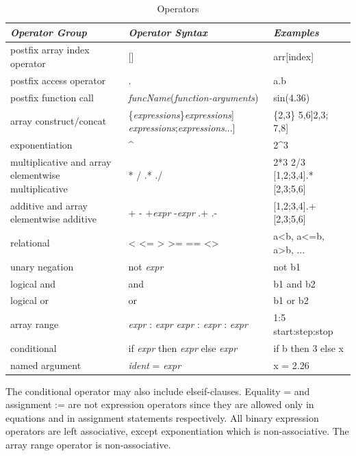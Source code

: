 \documentclass[10pt,a4paper]{report}
\begin{document}
\begin{table}
\caption{Operators}
\begin{tabular}{|p{3cm}|p{4cm}|p{3.5cm}|}
\hline
\emph{Operator Group} & \emph{Operator Syntax} & \emph{Examples} \\ \hline 
postfix array index operator & {[}{]} & arr{[}index{]} \\ \hline
postfix access operator & . & a.b \\ \hline
postfix function call & \emph{funcName}(\emph{function-arguments}) & sin(4.36)\\ \hline
array construct/concat & \{\emph{expressions}\}\linebreak {[}\emph{expressions}{]} \linebreak{[}\emph{expressions};\linebreak \emph{expressions}...{]} & 
\{2,3\} \linebreak{[}5,6{]}\linebreak{[}2,3; 7,8{]}\\ \hline
exponentiation & \^{} & 2\^{}3\\ \hline
multiplicative and array elementwise multiplicative & * / .* ./ & 2*3 2/3 {[}1,2;3,4{]}.*{[}2,3;5,6{]} \\ \hline
additive and array elementwise additive & + - +\emph{expr} -\emph{expr} .+ .- & {[}1,2;3,4{]}.+{[}2,3;5,6{]}\\ \hline
relational & \textless{} \textless{}= \textgreater{} \textgreater{}= == \textless{}\textgreater{} & 
a\textless{}b, a\textless{}=b, a\textgreater{}b, ...\\ \hline
unary negation & not \emph{expr} & not b1\\ \hline
logical and & and & b1 and b2\\ \hline
logical or & or & b1 or b2\\ \hline
array range & \emph{expr} : \emph{expr}
\emph{expr} : \emph{expr} : \emph{expr} & 1:5
start:step:stop\\ \hline
conditional & if \emph{expr} then \emph{expr} else \emph{expr} & if b
then 3 else x\\ \hline
named argument & \emph{ident} = \emph{expr} & x = 2.26\\ \hline
\end{tabular}
\end{table}

The conditional operator may also include elseif-clauses. Equality = and
assignment := are not expression operators since they are allowed only
in equations and in assignment statements respectively. All binary
expression operators are left associative, except exponentiation which
is non-associative. The array range operator is non-associative.
\end{document}
